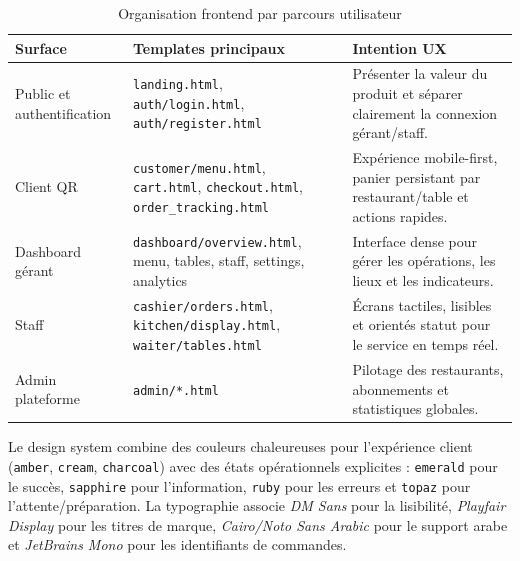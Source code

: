 \documentclass[12pt,a4paper]{report}
\begin{document}
\begin{table}[H]
    \centering
    \begin{tabularx}{\textwidth}{>{\RaggedRight\arraybackslash}p{3.8cm} X X}
        \toprule
        \rowcolor{primary!10}
        \textbf{Surface} & \textbf{Templates principaux} & \textbf{Intention UX} \\
        \midrule
        Public et authentification & \texttt{landing.html}, \texttt{auth/login.html}, \texttt{auth/register.html} & Présenter la valeur du produit et séparer clairement la connexion gérant/staff. \\
        Client QR & \texttt{customer/menu.html}, \texttt{cart.html}, \texttt{checkout.html}, \texttt{order\_tracking.html} & Expérience mobile-first, panier persistant par restaurant/table et actions rapides. \\
        Dashboard gérant & \texttt{dashboard/overview.html}, menu, tables, staff, settings, analytics & Interface dense pour gérer les opérations, les lieux et les indicateurs. \\
        Staff & \texttt{cashier/orders.html}, \texttt{kitchen/display.html}, \texttt{waiter/tables.html} & Écrans tactiles, lisibles et orientés statut pour le service en temps réel. \\
        Admin plateforme & \texttt{admin/*.html} & Pilotage des restaurants, abonnements et statistiques globales. \\
        \bottomrule
    \end{tabularx}
    \caption{Organisation frontend par parcours utilisateur}
    \label{tab:frontend-surfaces}
\end{table}

\begin{designbox}
Le design system combine des couleurs chaleureuses pour l'expérience client (\texttt{amber}, \texttt{cream}, \texttt{charcoal}) avec des états opérationnels explicites : \texttt{emerald} pour le succès, \texttt{sapphire} pour l'information, \texttt{ruby} pour les erreurs et \texttt{topaz} pour l'attente/préparation. La typographie associe \textit{DM Sans} pour la lisibilité, \textit{Playfair Display} pour les titres de marque, \textit{Cairo/Noto Sans Arabic} pour le support arabe et \textit{JetBrains Mono} pour les identifiants de commandes.
\end{designbox}
\end{document}
